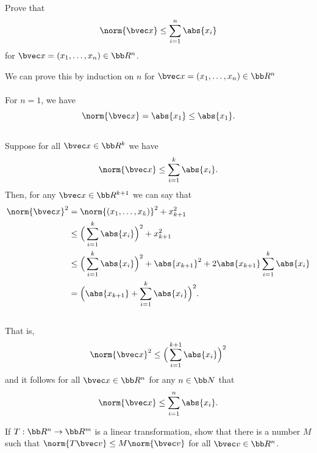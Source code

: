 \documentclass[12pt, letterpaper]{hmcpset}
\begin{document}
\begin{problem}[1]
	Prove that
	\[
		\norm{\bvec x} \le \sum_{i = 1}^n \abs{x_i}
	\]
	for $\bvec x = (x_1, \ldots, x_n) \in \bb R^n$.
\end{problem}

\begin{solution}
	We can prove this by induction on $n$ for $\bvec x = (x_{1}, \dots, x_{n}) \in \bb R^n$ \\\\
	For $n = 1$, we have
	\[
		\norm{\bvec x} = \abs{x_1} \le \abs{x_1}.
	\]\\
	Suppose for all $\bvec x \in \bb R^k$ we have
	\[
		\norm{\bvec x} \le \sum_{i = 1}^k \abs{x_i}.
	\]
	Then, for any $\bvec x \in \bb R^{k + 1}$ we can say that
	\[
		\begin{split}
			\norm{\bvec x}^2 & = \norm{(x_{1}, \dots, x_{k})}^2 + x_{k + 1}^2 \\
						 & \le \Big ( \sum_{i = 1}^k \abs{x_i} \Big )^2 + x_{k + 1}^2 \\
						 & \le \Big ( \sum_{i = 1}^k \abs{x_i} \Big )^2 + \abs{x_{k + 1}}^2 + 2 \abs{x_{k + 1}} \sum_{i = 1}^k \abs{x_i} \\
						 & = \Big ( \abs{x_{k + 1}} + \sum_{i = 1}^k \abs{x_i} \Big )^2.
		\end{split}
	\]\\
	That is,
	\[
		\norm{\bvec x}^2 \le \Big ( \sum_{i = 1}^{k + 1} \abs{x_i} \Big )^2
	\]
	and it follows for all $\bvec x \in \bb R^n$ for any $n \in \bb N$ that
	\[
		\norm{\bvec x} \le \sum_{i = 1}^n \abs{x_i}.
	\]
\end{solution}

\pagebreak

\begin{problem}[10]
	If $T : \bb R^n \to \bb R^m$ is a linear transformation, show that there is a number $M$ such that $\norm{T \bvec v} \le M \norm{\bvec v}$ for all $\bvec v \in \bb R^n$.
\end{problem}
\end{document}
